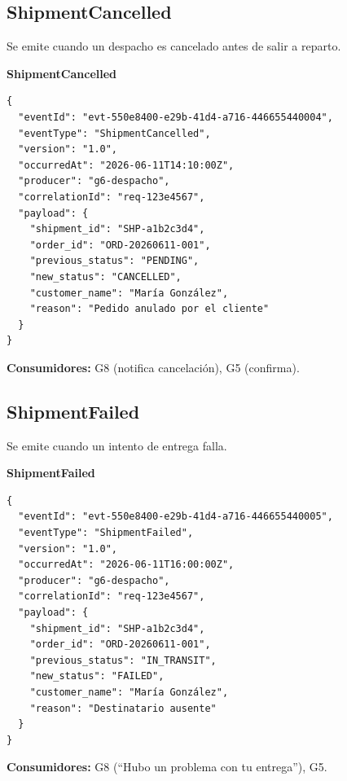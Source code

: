 \documentclass[11pt, a4paper]{article}
\newcommand{\contractheader}[1]{%
  \noindent\colorbox{primary!10}{%
    \parbox{\dimexpr\textwidth-2\fboxsep}{%
      \textbf{\faFileCode\quad #1}%
    }%
  }
  \vspace{0.3cm}
}
\begin{document}
\vspace{0.4cm}

\subsection{ShipmentCancelled}

Se emite cuando un despacho es cancelado antes de salir a reparto.

\contractheader{ShipmentCancelled}

\begin{lstlisting}
{
  "eventId": "evt-550e8400-e29b-41d4-a716-446655440004",
  "eventType": "ShipmentCancelled",
  "version": "1.0",
  "occurredAt": "2026-06-11T14:10:00Z",
  "producer": "g6-despacho",
  "correlationId": "req-123e4567",
  "payload": {
    "shipment_id": "SHP-a1b2c3d4",
    "order_id": "ORD-20260611-001",
    "previous_status": "PENDING",
    "new_status": "CANCELLED",
    "customer_name": "María González",
    "reason": "Pedido anulado por el cliente"
  }
}
\end{lstlisting}

\textbf{Consumidores:} G8 (notifica cancelación), G5 (confirma).

\vspace{0.4cm}

\subsection{ShipmentFailed}

Se emite cuando un intento de entrega falla.

\contractheader{ShipmentFailed}

\begin{lstlisting}
{
  "eventId": "evt-550e8400-e29b-41d4-a716-446655440005",
  "eventType": "ShipmentFailed",
  "version": "1.0",
  "occurredAt": "2026-06-11T16:00:00Z",
  "producer": "g6-despacho",
  "correlationId": "req-123e4567",
  "payload": {
    "shipment_id": "SHP-a1b2c3d4",
    "order_id": "ORD-20260611-001",
    "previous_status": "IN_TRANSIT",
    "new_status": "FAILED",
    "customer_name": "María González",
    "reason": "Destinatario ausente"
  }
}
\end{lstlisting}

\textbf{Consumidores:} G8 (``Hubo un problema con tu entrega''), G5.

\vspace{0.4cm}
\end{document}
